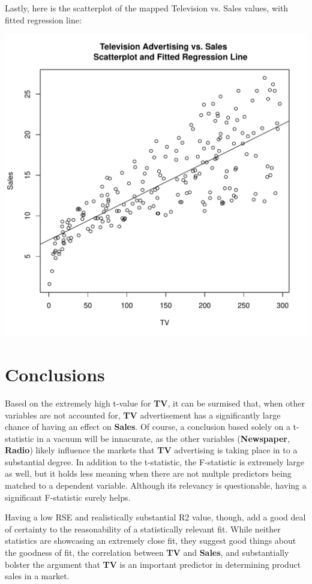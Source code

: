 \documentclass{article}
\begin{document}
Lastly, here is the scatterplot of the mapped Television vs. Sales values, with fitted regression line:

\includegraphics[]{scatterplot-tv-sales.pdf}




\section*{Conclusions}

Based on the extremely high t-value for \textbf{TV}, it can be surmised that, when other variables are not accounted for, \textbf{TV} advertisement has a significantly large chance of having an effect on \textbf{Sales}. Of course, a conclusion based solely on a t-statistic in a vacuum will be innacurate, as the other variables (\textbf{Newspaper}, \textbf{Radio}) likely influence the markets that \textbf{TV} advertising is taking place in to a substantial degree. In addition to the t-statistic, the F-statistic is extremely large as well, but it holds less meaning when there are not multple predictors being matched to a dependent variable. Although its relevancy is questionable, having a significant F-statistic surely helps.  


Having a low RSE and realistically substantial R2 value, though, add a good deal of certainty to the reasonability of a statistically relevant fit. While neither statistics are showcasing an extremely close fit, they suggest good things about the goodness of fit, the correlation between \textbf{TV} and \textbf{Sales}, and substantially bolster the argument that \textbf{TV} is an important predictor in determining product sales in a market.  
\end{document}
